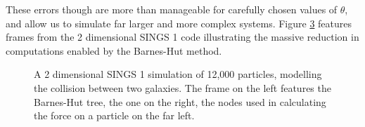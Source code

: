 \documentclass[12pt, twoside, letterpaper]{article}
\begin{document}
These errors though are more than manageable for carefully chosen values of $\theta$, and allow us to simulate far larger and more complex systems. Figure \ref{fig:sings1bh} features frames from the 2 dimensional SINGS 1 code illustrating the massive reduction in computations enabled by the Barnes-Hut method.
\begin{figure}
\centering
\setlength{\fboxsep}{-1pt}
\setlength{\fboxrule}{1pt}
\begin{subfigure}[t]{.45\textwidth}
  \centering
  \label{fig:sub1}
\end{subfigure}%
\begin{subfigure}[t]{.45\textwidth}
  \centering
  \label{fig:sub2}
\end{subfigure}
\caption{A 2 dimensional SINGS 1 simulation of 12,000 particles, modelling the collision between two galaxies. The frame on the left features the Barnes-Hut tree, the one on the right, the nodes used in calculating the force on a particle on the far left.}
\label{fig:sings1bh}
\end{figure}
\end{document}
